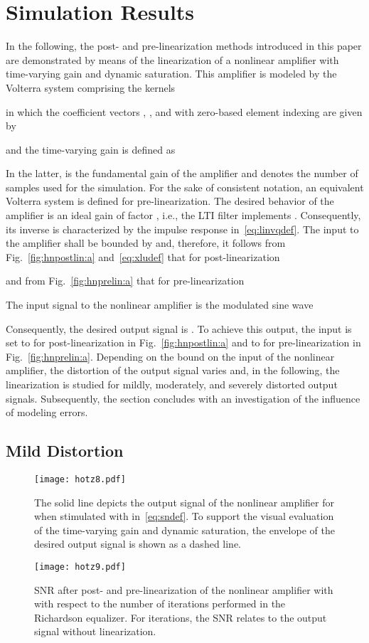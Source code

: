 \documentclass[10pt,twocolumn,twoside]{IEEEtran}
\begin{document}
\section{Simulation Results}
	\label{results}

In the following, the post- and pre-linearization methods introduced in this
paper are demonstrated by means of the linearization of a
nonlinear amplifier with time-varying gain and dynamic saturation.
This amplifier is modeled by the Volterra system  comprising the kernels

in which the coefficient vectors , , and 
with zero-based element indexing are given by

and the time-varying gain  is defined as

In the latter,  is the fundamental gain of the amplifier and
 denotes the number of samples used for the simulation. For the sake
of consistent notation, an equivalent Volterra system 
is defined for pre-linearization. The desired behavior of the amplifier is
an ideal gain of factor , i.e., the LTI filter  implements .
Consequently, its inverse  is characterized by the impulse
response  in~\eqref{eq:linvqdef}. The input to the amplifier shall
be bounded by  and, therefore, it follows from Fig.~\ref{fig:hnpostlin:a}
and~\eqref{eq:xludef} that for post-linearization

and from Fig.~\ref{fig:hnprelin:a} that for pre-linearization

The input signal to the nonlinear amplifier is the modulated sine wave

Consequently, the desired output
signal is . To achieve this output, the input is set to 
for post-linearization in Fig.~\ref{fig:hnpostlin:a} and to  for
pre-linearization in Fig.~\ref{fig:hnprelin:a}.
Depending on the bound  on the input of the nonlinear amplifier,
the distortion of the output signal varies and, in the following,
the linearization is studied for mildly, moderately, and severely
distorted output signals. Subsequently, the section concludes with
an investigation of the influence of modeling errors.


\subsection{Mild Distortion}
	\label{results:mild}

\begin{figure}[!t]\centering \texttt{[image: hotz8.pdf]}\caption{The solid line depicts the output signal of the nonlinear
	amplifier for  when stimulated with  in~\eqref{eq:sndef}. To support the
	visual evaluation of the time-varying gain and dynamic saturation,
	the envelope of the desired output signal is shown as a dashed line.}\label{fig:inoutcmpb075}\end{figure}\begin{figure}[!t]\centering \texttt{[image: hotz9.pdf]}\caption{SNR after post- and pre-linearization of the nonlinear amplifier with 
	with respect to the number of iterations performed in the Richardson equalizer.
	For  iterations, the SNR relates to the output signal without linearization.}\label{fig:snrb075}\end{figure}
\end{document}
